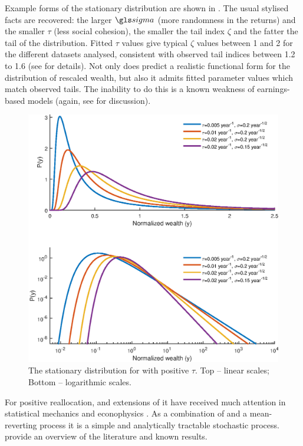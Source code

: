 Example forms of the stationary distribution are shown in . The usual stylised facts are recovered: the larger $\gsigma$ (more randomness in the returns) and the smaller $\tau$ (less social cohesion), the smaller the tail index $\zeta$ and the fatter the tail of the distribution. Fitted $\tau$ values give typical $\zeta$ values between 1 and 2 for the different datasets analysed, consistent with observed tail indices between 1.2 to 1.6 (see \cite{BermanPetersAdamou2017} for details). Not only does \RGBM predict a realistic functional form for the distribution of rescaled wealth, but also it admits fitted parameter values which match observed tails. The inability to do this is a known weakness of earnings-based models (again, see \cite{BermanPetersAdamou2017} for discussion).

\begin{figure}[!htb]
\centering
\includegraphics[width=1.0\textwidth] {./chapter_3/figs/dists.eps}
\caption{The stationary distribution for \RGBM with positive $\tau$. Top -- linear scales; Bottom -- logarithmic scales.}
\end{figure}

For positive reallocation,  and extensions of it have received much attention in statistical mechanics and econophysics \cite{BouchaudMezard2000,Bouchaud2015}. As a combination of \GBM and a mean-reverting process it is a simple and analytically tractable stochastic process. \cite{LiuSerota2016} provide an overview of the literature and known results.

